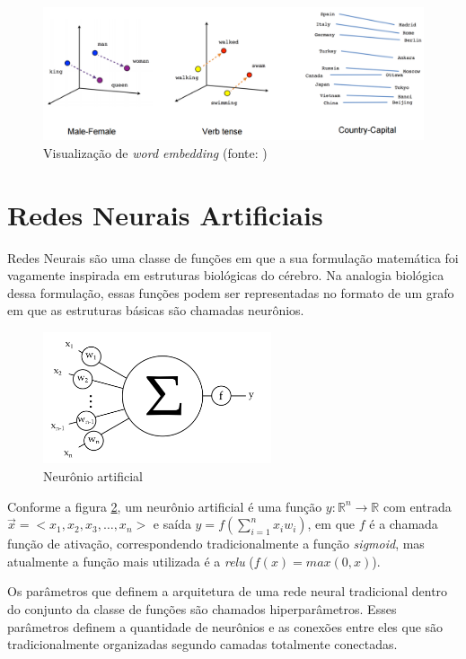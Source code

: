 \begin{figure}[!ht]
	\centering
	\includegraphics[width=\textwidth]{figures/Word-Vectors.png}
	\caption{Visualização de \textit{word embedding} (fonte: \cite{TensorflowWord2Vec})}
	\label{fig:wordembedding}
\end{figure}

\section{Redes Neurais Artificiais}

Redes Neurais são uma classe de funções em que a sua formulação matemática foi vagamente inspirada em estruturas biológicas do cérebro. Na analogia biológica dessa formulação, essas funções podem ser representadas no formato de um grafo em que as estruturas básicas são chamadas neurônios.

\begin{figure}[!ht]
	\centering
	\includegraphics[width=0.6\textwidth]{figures/neuron.png}
	\caption{Neurônio artificial}
	\label{fig:neuron}
\end{figure}

Conforme a figura \ref{fig:neuron}, um neurônio artificial é uma função $y:\mathbb R^n \rightarrow \mathbb R$ com entrada $\vec x = <x_1,x_2,x_3,\dots,x_n>$ e saída $y = f(\sum\limits_{i=1}^n x_iw_i)$, em que $f$ é a chamada função de ativação, correspondendo tradicionalmente a função \textit{sigmoid}, mas atualmente a função mais utilizada é a \textit{relu} ($f(x) = max(0, x)$).

Os parâmetros que definem a arquitetura de uma rede neural tradicional dentro do conjunto da classe de funções são chamados hiperparâmetros. Esses parâmetros definem a quantidade de neurônios e as conexões entre eles que são tradicionalmente organizadas segundo camadas totalmente conectadas.

